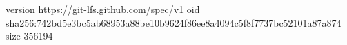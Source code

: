 version https://git-lfs.github.com/spec/v1
oid sha256:742bd5e3bc5ab68953a88be10b9624f86ee8a4094c5f8f7737bc52101a87a874
size 356194
